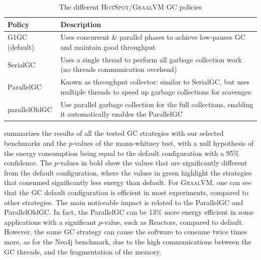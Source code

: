 \begin{table}
    \centering
    \caption{The different \textsc{HotSpot}/\textsc{GraalVM} GC policies}
    \label{table:GCHS}
    \small
    \begin{tabular}{|p{}|p{}|}
        \hline
        \textbf{Policy}          & \textbf{Description}                                                                                                                 \\
        \hline
        \hline
        \textsf{G1GC}\,(default) & Uses concurrent \& parallel phases to achieve low-pauses GC and maintain good throughput                                             \\
        \hline
        \textsf{SerialGC}        & Uses a single thread to perform all garbage collection work (no threads communication overhead)                                      \\
        \hline
        \textsf{ParallelGC}      & Known as throughput collector: similar to \textsf{SerialGC}, but uses multiple threads to speed up garbage collections for scavenges \\
        \hline
        \textsf{parallelOldGC}   & Use parallel garbage collection for the full collections, enabling it automatically enables the \textsf{ParallelGC}                  \\
        \hline
    \end{tabular}
\end{table}



 summarizes the results of all the tested GC strategies with our selected benchmarks and the $p$-values of the mann-whitney test, with a null hypothesis of the energy consumption being equal to the default configuration with a 95\% confidence.
The $p$-values in bold show the values that are significantly different from the default configuration, where the values in green highlight the strategies that consumed significantly less energy than default.
For \textsc{GraalVM}, one can see that the GC default configuration is efficient in most experiments, compared to other strategies.
The main noticeable impact is related to the \textsf{ParallelGC} and \textsf{ParallelOldGC}.
In fact, the \textsf{ParallelGC} can be 13\% more energy efficient in some applications with a significant $p$-value, such as \textsf{Reactors}, compared to default.
However, the same GC strategy can cause the software to consume twice times more, as for the \textsf{Neo4j} benchmark, due to the high communications between the GC threads, and the fragmentation of the memory.

